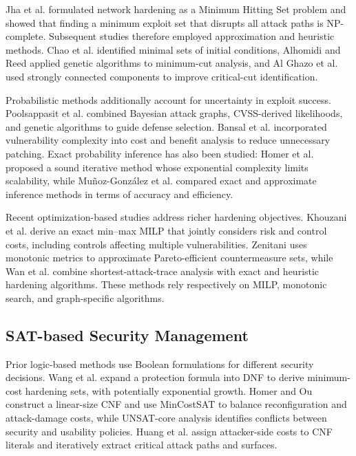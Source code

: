 \documentclass[conference]{IEEEtran}
\theoremstyle{definition} %
\theoremstyle{plain} %
\begin{document}
{Jha et al. \cite{jha2002two} formulated network hardening as a Minimum Hitting Set problem and showed that finding a minimum exploit set that disrupts all attack paths is NP-complete. Subsequent studies therefore employed approximation and heuristic methods. Chao et al. \cite{chao2014heuristic} identified minimal sets of initial conditions, Alhomidi and Reed \cite{alhomidi2012attack} applied genetic algorithms to minimum-cut analysis, and Al Ghazo et al. \cite{al2023critical} used strongly connected components to improve critical-cut identification.

Probabilistic methods additionally account for uncertainty in exploit success. Poolsappasit et al. \cite{poolsappasit2011dynamic} combined Bayesian attack graphs, CVSS-derived likelihoods, and genetic algorithms to guide defense selection. Bansal et al. \cite{bansal2023quantitative} incorporated vulnerability complexity into cost and benefit analysis to reduce unnecessary patching. Exact probability inference has also been studied: Homer et al. \cite{homer2009sound} proposed a sound iterative method whose exponential complexity limits scalability, while Mu\~{n}oz-Gonz\'{a}lez et al. \cite{munoz2017exact} compared exact and approximate inference methods in terms of accuracy and efficiency.

Recent optimization-based studies address richer hardening objectives. Khouzani et al. \cite{KHOUZANI2019894} derive an exact min--max MILP that jointly considers risk and control costs, including controls affecting multiple vulnerabilities. Zenitani \cite{zenitani2022multi} uses monotonic metrics to approximate Pareto-efficient countermeasure sets, while Wan et al. \cite{wan2023iot} combine shortest-attack-trace analysis with exact and heuristic hardening algorithms. These methods rely respectively on MILP, monotonic search, and graph-specific algorithms.

\subsection{SAT-based Security Management}

Prior logic-based methods use Boolean formulations for different security decisions. Wang et al. \cite{wang2006minimum} expand a protection formula into DNF to derive minimum-cost hardening sets, with potentially exponential growth. Homer and Ou \cite{homer2009sat} construct a linear-size CNF and use MinCostSAT to balance reconfiguration and attack-damage costs, while UNSAT-core analysis identifies conflicts between security and usability policies. Huang et al. \cite{huang2011distilling} assign attacker-side costs to CNF literals and iteratively extract critical attack paths and surfaces. 

}
\end{document}

